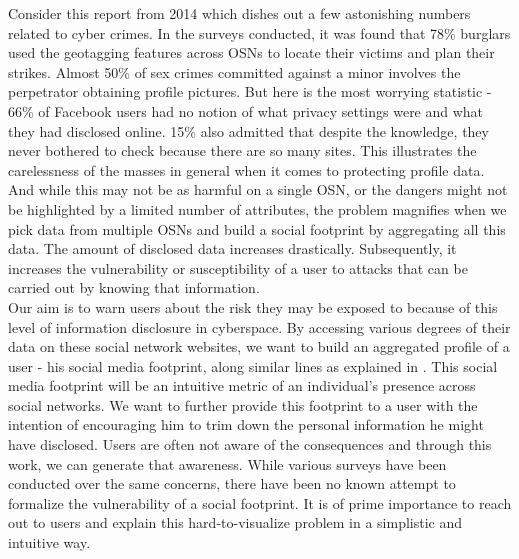 \documentclass[10pt,conference]{IEEEtran}
\begin{document}
Consider this report \cite{newsarticle} from 2014 which dishes out a few astonishing numbers related to cyber crimes. In the surveys conducted, it was found that 78\% burglars used the geotagging features across OSNs to locate their victims and plan their strikes. Almost 50\% of sex crimes committed against a minor involves the perpetrator obtaining profile pictures. But here is the most worrying statistic - 66\% of Facebook users had no notion of what privacy settings were and what they had disclosed online. 15\% also admitted that despite the knowledge, they never bothered to check because there are so many sites. This illustrates the carelessness of the masses in general when it comes to protecting profile data. And while this may not be as harmful on a single OSN, or the dangers might not be highlighted by a limited number of attributes, the problem magnifies when we pick data from multiple OSNs and build a social footprint by aggregating all this data. The amount of disclosed data increases drastically. Subsequently, it increases the vulnerability or susceptibility of a user to attacks that can be carried out by knowing that information.\\

Our aim is to warn users about the risk they may be exposed to because of this level of information disclosure in cyberspace. By accessing various degrees of their data on these social network websites, we want to build an aggregated profile of a user - his social media footprint, along similar lines as explained in \cite{emergingthreat}. This social media footprint will be an intuitive metric of an individual’s presence across social networks. We want to further provide this footprint to a user with the intention of encouraging him to trim down the personal information he might have disclosed. Users are often not aware of the consequences and through this work, we can generate that awareness. While various surveys have been conducted over the same concerns, there have been no known attempt to formalize the vulnerability of a social footprint. It is of prime importance to reach out to users and explain this hard-to-visualize problem in a simplistic and intuitive way.

\end{document}
